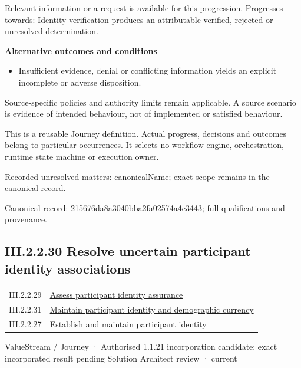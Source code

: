 Relevant information or a request is available for this progression. Progresses towards: Identity verification produces an attributable verified, rejected or unresolved determination.



\par\medskip\textbf{Alternative outcomes and conditions}\par


\begin{itemize}


\item Insufficient evidence, denial or conflicting information yields an explicit incomplete or adverse disposition.

\end{itemize}


Source-specific policies and authority limits remain applicable. A source scenario is evidence of intended behaviour, not of implemented or satisfied behaviour.



This is a reusable Journey definition. Actual progress, decisions and outcomes belong to particular occurrences. It selects no workflow engine, orchestration, runtime state machine or execution owner.


{\small Recorded unresolved matters: canonicalName; exact scope remains in the canonical record.}\par
{\footnotesize \href{../../../../continuum/strategy/value-stream/215676da8a3040bba2fa02574a4c3443.md}{Canonical record: 215676da8a3040bba2fa02574a4c3443}; full qualifications and provenance.}\par
\subsection*{III.2.2.30 Resolve uncertain participant identity associations}
\label{navigation:III.2.2.30}

\begin{longtable}{p{.22\linewidth}p{.73\linewidth}}
III.2.2.29 & \hyperref[element:215676da8a3040bba2fa02574a4c3443]{Assess participant identity assurance} \\
III.2.2.31 & \hyperref[element:393b2a5eeda94c36841c2673ca1f391e]{Maintain participant identity and demographic currency} \\
III.2.2.27 & \hyperref[element:f0ce31d5b71c4c5ab37ade566b224808]{Establish and maintain participant identity} \\
\end{longtable}
\label{element:32fcf92667ae46578ab213f879c8a799}
{\small ValueStream / Journey · Authorised 1.1.21 incorporation candidate; exact incorporated result pending Solution Architect review · current}\par

